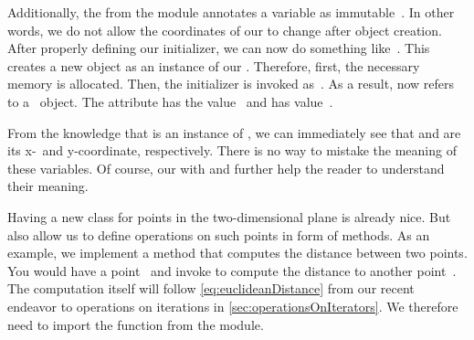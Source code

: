 Additionally, the   from the  module annotates a variable as immutable~\cite{PEP591}.
In other words, we do not allow the coordinates of our  to change after object creation.%
%
%
%
%
%
%
%
After properly defining our initializer, we can now do something like~.
This creates a new object as an instance of our  .
Therefore, first, the necessary memory is allocated.
Then, the initializer is invoked as~.
As a result,  now refers to a ~object.
The attribute  has the value~ and  has value~.

From the knowledge that  is an instance of , we can immediately see that  and  are its x-\ and y\nobreakdashes-coordinate, respectively.
There is no way to mistake the meaning of these variables.
Of course, our  with  and  further help the reader to understand their meaning.

Having a new class for points in the two-dimensional plane is already nice.
But  also allow us to define operations on such points in form of methods.
As an example, we implement a method  that computes the distance between two points.
You would have a point~ and invoke  to compute the distance to another point~.
The computation itself will follow \cref{eq:euclideanDistance} from our recent endeavor to operations on iterations in \cref{sec:operationsOnIterators}.
We therefore need to import the  function from the  module.

